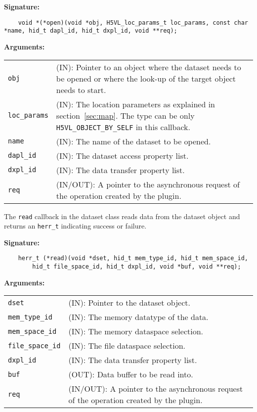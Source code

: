 \begin{mdframed}[style=bgbox]
\textbf{Signature:}
\begin{lstlisting}
    void *(*open)(void *obj, H5VL_loc_params_t loc_params, const char *name, hid_t dapl_id, hid_t dxpl_id, void **req);
\end{lstlisting}

\textbf{Arguments:}\\
\begin{tabular}{l p{10cm}}
  \texttt{obj} & (IN): Pointer to an object where the dataset needs to be
  opened or where the look-up of the target object needs to start.\\
  \texttt{loc\_params} & (IN): The location parameters as explained in
  section~\ref{sec:map}. The type can be only \texttt{H5VL\_OBJECT\_BY\_SELF} in this callback. \\
  \texttt{name} & (IN): The name of the dataset to be opened.\\
  \texttt{dapl\_id} & (IN): The dataset access property list.\\
  \texttt{dxpl\_id} & (IN): The data transfer property list.\\
  \texttt{req} & (IN/OUT): A pointer to the asynchronous request of the
  operation created by the plugin.\\
\end{tabular}
\end{mdframed}

The \texttt{read} callback in the dataset class  reads data from
the dataset object and returns an \texttt{herr\_t} indicating success or
failure.\bigskip

\begin{mdframed}[style=bgbox]
\textbf{Signature:}
\begin{lstlisting}
    herr_t (*read)(void *dset, hid_t mem_type_id, hid_t mem_space_id, 
        hid_t file_space_id, hid_t dxpl_id, void *buf, void **req);
\end{lstlisting}

\textbf{Arguments:}\\
\begin{tabular}{l p{10cm}}
  \texttt{dset} & (IN): Pointer to the dataset object.\\
  \texttt{mem\_type\_id} & (IN): The memory datatype of the data.\\
  \texttt{mem\_space\_id} & (IN): The memory dataspace selection.\\
  \texttt{file\_space\_id} & (IN): The file dataspace selection.\\
  \texttt{dxpl\_id} & (IN): The data transfer property list.\\
  \texttt{buf} & (OUT): Data buffer to be read into.\\
  \texttt{req} & (IN/OUT): A pointer to the asynchronous request of the
  operation created by the plugin.\\
\end{tabular}
\end{mdframed}

